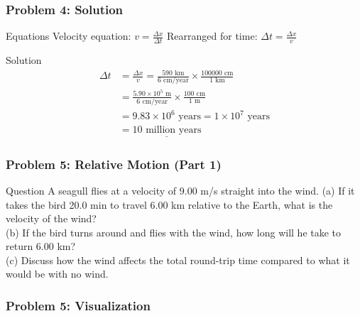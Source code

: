 \documentclass{beamer}
\begin{document}
\begin{frame}
\frametitle{Problem 4: Solution}
\begin{block}{Equations}
Velocity equation: $v = \frac{\Delta x}{\Delta t}$
Rearranged for time: $\Delta t = \frac{\Delta x}{v}$
\end{block}
\begin{block}{Solution}
\begin{align*}
\Delta t &= \frac{\Delta x}{v} = \frac{590 \text{ km}}{6 \text{ cm/year}} \times \frac{100000 \text{ cm}}{1 \text{ km}}\\
&= \frac{5.90 \times 10^5 \text{ m}}{6 \text{ cm/year}} \times \frac{100 \text{ cm}}{1 \text{ m}}\\
&= 9.83 \times 10^6 \text{ years} = 1 \times 10^7 \text{ years}\\
&= \underline{10 \text{ million years}}
\end{align*}
\end{block}
\end{frame}

\begin{frame}
\frametitle{Problem 5: Relative Motion (Part 1)}
\begin{block}{Question}
A seagull flies at a velocity of 9.00 m/s straight into the wind.
(a) If it takes the bird 20.0 min to travel 6.00 km relative to the Earth, what is the velocity of the wind?\\
(b) If the bird turns around and flies with the wind, how long will he take to return 6.00 km?\\
(c) Discuss how the wind affects the total round-trip time compared to what it would be with no wind.
\end{block}
\end{frame}

\begin{frame}
\frametitle{Problem 5: Visualization}
\end{frame}
\end{document}
